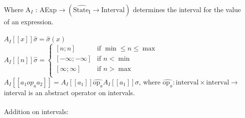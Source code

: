 Where A$_I$ : AExp$ \rightarrow (\widehat{\text{State}_{\text{I}}} \rightarrow \text{Interval})$ determines the interval for the value of an expression.\\\\

$A_I[\![x]\!]\widehat{\sigma} = \widehat{\sigma}(x)$ \\
$A_I[\![n]\!]\widehat{\sigma} = 
     \begin{cases} 
        [n;n] & \text{if } \min \leq n \leq \max \\
        [-\infty;-\infty] & \text{if } n < \min\\
        [\infty;\infty] & \text{if } n > \max\\
     \end{cases}$\\

$A_I[\![a_1 op_a a_2 ]\!] = A_I[\![a_1]\!] \widehat{\text{op}_a} A_I[\![a_1]\!]\sigma $, where $  \widehat{\text{op}_a} : \text{interval} \times \text{interval} \rightarrow $  interval is an abstract operator on intervals.\\
\\
Addition on intervals:
